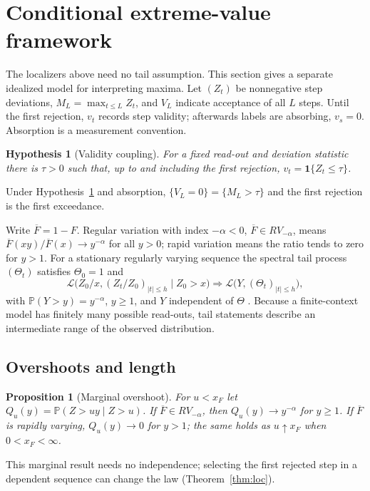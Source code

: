 \documentclass{article}
\newtheorem{hypothesis}{Hypothesis}
\newtheorem{proposition}{Proposition}
\newcommand{\Fbar}{\overline{F}}
\newcommand{\PP}{\mathbb{P}}
\newcommand{\1}{\mathbf{1}}
\begin{document}
\section{Conditional extreme-value framework}\label{sec:theory}

The localizers above need no tail assumption. This section gives a separate idealized model for interpreting maxima. Let $(Z_t)$ be nonnegative step deviations, $M_L=\max_{t\le L}Z_t$, and $V_L$ indicate acceptance of all $L$ steps. Until the first rejection, $v_t$ records step validity; afterwards labels are absorbing, $v_s=0$. Absorption is a measurement convention.

\begin{hypothesis}[Validity coupling]\label{hyp:coupling}
For a fixed read-out and deviation statistic there is $\tau>0$ such that, up to and including the first rejection, $v_t=\1\{Z_t\le\tau\}$.
\end{hypothesis}
Under Hypothesis~\ref{hyp:coupling} and absorption, $\{V_L=0\}=\{M_L>\tau\}$ and the first rejection is the first exceedance.

Write $\Fbar = 1-F$. Regular variation with index $-\alpha<0$, $\Fbar\in RV_{-\alpha}$, means $\Fbar(xy)/\Fbar(x)\to y^{-\alpha}$ for all $y>0$; rapid variation means the ratio tends to zero for $y>1$. For a stationary regularly varying sequence the spectral tail process $(\Theta_t)$ satisfies $\Theta_0=1$ and
\begin{equation}\label{eq:tail}
\mathcal{L}\bigl(Z_0/x,(Z_t/Z_0)_{|t|\le h}\mid Z_0>x\bigr)\Rightarrow\mathcal{L}\bigl(Y,(\Theta_t)_{|t|\le h}\bigr),
\end{equation}
with $\PP(Y>y)=y^{-\alpha}$, $y\ge1$, and $Y$ independent of $\Theta$ \citep{basrak2009}. Because a finite-context model has finitely many possible read-outs, tail statements describe an intermediate range of the observed distribution.

\subsection{Overshoots and length}

\begin{proposition}[Marginal overshoot]\label{prop:overshoot}
For $u<x_F$ let $Q_u(y)=\PP(Z>uy\mid Z>u)$. If $\Fbar\in RV_{-\alpha}$, then $Q_u(y)\to y^{-\alpha}$ for $y\ge1$. If $\Fbar$ is rapidly varying, $Q_u(y)\to0$ for $y>1$; the same holds as $u\uparrow x_F$ when $0<x_F<\infty$.
\end{proposition}
This marginal result needs no independence; selecting the first rejected step in a dependent sequence can change the law (Theorem~\ref{thm:loc}).
\end{document}
